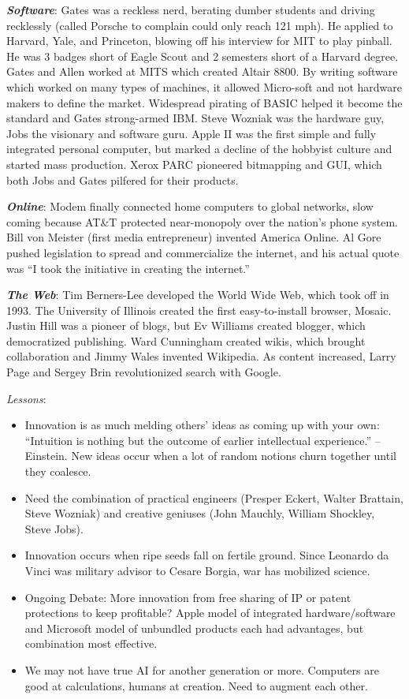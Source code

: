 \documentclass[
]{article}
\begin{document}
\textbf{\emph{Software}}: Gates was a reckless nerd, berating dumber
students and driving recklessly (called Porsche to complain could only
reach 121 mph). He applied to Harvard, Yale, and Princeton, blowing off
his interview for MIT to play pinball. He was 3 badges short of Eagle
Scout and 2 semesters short of a Harvard degree. Gates and Allen worked
at MITS which created Altair 8800. By writing software which worked on
many types of machines, it allowed Micro-soft and not hardware makers to
define the market. Widespread pirating of BASIC helped it become the
standard and Gates strong-armed IBM. Steve Wozniak was the hardware guy,
Jobs the visionary and software guru. Apple II was the first simple and
fully integrated personal computer, but marked a decline of the hobbyist
culture and started mass production. Xerox PARC pioneered bitmapping and
GUI, which both Jobs and Gates pilfered for their products.

\textbf{\emph{Online}}: Modem finally connected home computers to global
networks, slow coming because AT\&T protected near-monopoly over the
nation's phone system. Bill von Meister (first media entrepreneur)
invented America Online. Al Gore pushed legislation to spread and
commercialize the internet, and his actual quote was ``I took the
initiative in creating the internet.''

\textbf{\emph{The Web}}: Tim Berners-Lee developed the World Wide Web,
which took off in 1993. The University of Illinois created the first
easy-to-install browser, Mosaic. Justin Hill was a pioneer of blogs, but
Ev Williams created blogger, which democratized publishing. Ward
Cunningham created wikis, which brought collaboration and Jimmy Wales
invented Wikipedia. As content increased, Larry Page and Sergey Brin
revolutionized search with Google.

\emph{Lessons}:

\begin{itemize}
\item
  Innovation is as much melding others' ideas as coming up with your
  own: ``Intuition is nothing but the outcome of earlier intellectual
  experience.'' --Einstein. New ideas occur when a lot of random notions
  churn together until they coalesce.
\item
  Need the combination of practical engineers (Presper Eckert, Walter
  Brattain, Steve Wozniak) and creative geniuses (John Mauchly, William
  Shockley, Steve Jobs).
\item
  Innovation occurs when ripe seeds fall on fertile ground. Since
  Leonardo da Vinci was military advisor to Cesare Borgia, war has
  mobilized science.
\item
  Ongoing Debate: More innovation from free sharing of IP or patent
  protections to keep profitable? Apple model of integrated
  hardware/software and Microsoft model of unbundled products each had
  advantages, but combination most effective.
\item
  We may not have true AI for another generation or more. Computers are
  good at calculations, humans at creation. Need to augment each other.
\end{itemize}
\end{document}
